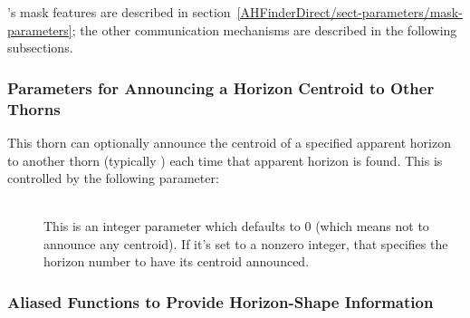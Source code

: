 's mask features are described in
section~\ref{AHFinderDirect/sect-parameters/mask-parameters};
the other communication mechanisms are described in the following
subsections.


\subsubsection{Parameters for Announcing a Horizon Centroid to Other Thorns}

This thorn can optionally announce the centroid of a specified
apparent horizon to another thorn (typically )
each time that apparent horizon is found.  This is controlled by the
following parameter:

\begin{description}
\item[]
\mbox{}\\
	This is an integer parameter which defaults to
	0 (which means not to announce any centroid).
	If it's set to a nonzero integer, that specifies the
	horizon number to have its centroid announced.
\end{description}


\subsubsection{Aliased Functions to Provide Horizon-Shape Information}

